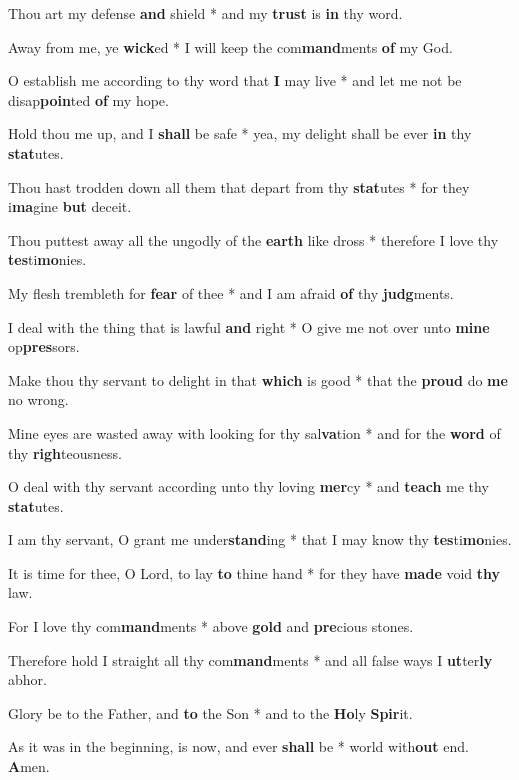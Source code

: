\begin{multicols}{2}
	Thou art my defense \textbf{and} shield * and my \textbf{trust} is \textbf{in} thy word.
	
	Away from me, ye \textbf{wick}ed * I will keep the com\textbf{mand}ments \textbf{of} my God.
	
	O establish me according to thy word that \textbf{I} may live * and let me not be disap\textbf{poin}ted \textbf{of} my hope.
	
	Hold thou me up, and I \textbf{shall} be safe * yea, my delight shall be ever \textbf{in} thy \textbf{stat}utes.
	
	Thou hast trodden down all them that depart from thy \textbf{stat}utes * for they i\textbf{ma}gine \textbf{but} deceit.
	
	Thou puttest away all the ungodly of the \textbf{earth} like dross * therefore I love thy \textbf{tes}ti\textbf{mo}nies.
	
	My flesh trembleth for \textbf{fear} of thee * and I am afraid \textbf{of} thy \textbf{judg}ments.
	
	I deal with the thing that is lawful \textbf{and} right * O give me not over unto \textbf{mine} op\textbf{pres}sors.
	
	Make thou thy servant to delight in that \textbf{which} is good * that the \textbf{proud} do \textbf{me} no wrong.
	
	Mine eyes are wasted away with looking for thy sal\textbf{va}tion * and for the \textbf{word} of thy \textbf{righ}teousness.
	
	O deal with thy servant according unto thy loving \textbf{mer}cy * and \textbf{teach} me thy \textbf{stat}utes.
	
	I am thy servant, O grant me under\textbf{stand}ing * that I may know thy \textbf{tes}ti\textbf{mo}nies.
	
	It is time for thee, O Lord, to lay \textbf{to} thine hand * for they have \textbf{made} void \textbf{thy} law.
	
	For I love thy com\textbf{mand}ments * above \textbf{gold} and \textbf{pre}cious stones.
	
	Therefore hold I straight all thy com\textbf{mand}ments * and all false ways I \textbf{ut}ter\textbf{ly} abhor. 
	
	Glory be to the Father, and \textbf{to} the Son * and to the \textbf{Ho}ly \textbf{Spir}it.
	
	As it was in the beginning, is now, and ever \textbf{shall} be * world with\textbf{out} end. \textbf{A}men.
\end{multicols}